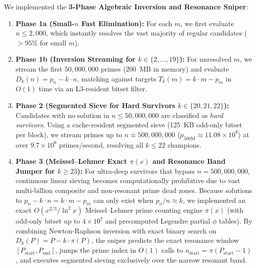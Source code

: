 \documentclass[11pt,a4paper]{article}
\theoremstyle{definition}
\theoremstyle{remark}
\begin{document}
We implemented the \textbf{3-Phase Algebraic Inversion and Resonance Sniper}:
\begin{enumerate}
    \item \textbf{Phase 1a (Small-$n$ Fast Elimination):} For each $m$, we first evaluate $n \le 2,000$, which instantly resolves the vast majority of regular candidates ($>95\%$ for small $m$).
    \item \textbf{Phase 1b (Inversion Streaming for $k \in \{2, \dots, 19\}$):} For unresolved $m$, we stream the first $50,000,000$ primes ($200$~MB in memory) and evaluate $D_k(n) = p_n - k \cdot n$, matching against targets $T_k(m) = k \cdot m - p_m$ in $O(1)$ time via an L3-resident bitset filter.
    \item \textbf{Phase 2 (Segmented Sieve for Hard Survivors $k \in \{20, 21, 22\}$):} Candidates with no solution in $n \le 50,000,000$ are classified as \textit{hard survivors}. Using a cache-resident segmented sieve (125~KB odd-only bitset per block), we stream primes up to $n \approx 500,000,000$ ($p_{500\text{M}} \approx 11.08 \times 10^9$) at over $9.7 \times 10^6$ primes/second, resolving all $k \le 22$ champions.
    \item \textbf{Phase 3 (Meissel--Lehmer Exact $\pi(x)$ and Resonance Band Jumper for $k \ge 23$):} For ultra-deep survivors that bypass $n = 500,000,000$, continuous linear sieving becomes computationally prohibitive due to vast multi-billion composite and non-resonant prime dead zones. Because solutions to $p_n - k \cdot n = k \cdot m - p_m$ can only exist when $p_n / n \approx k$, we implemented an exact $O(x^{2/3}/\ln^2 x)$ Meissel--Lehmer prime counting engine $\pi(x)$ (with odd-only bitset up to $4 \times 10^7$ and precomputed Legendre partial $\phi$ tables). By combining Newton-Raphson inversion with exact binary search on $D_k(P) = P - k \cdot \pi(P)$, the sniper predicts the exact resonance window $[P_{\text{start}}, P_{\text{end}}]$, jumps the prime index in $O(1)$ calls to $n_{\text{start}} = \pi(P_{\text{start}}-1)$, and executes segmented sieving exclusively over the narrow resonant band.
\end{enumerate}
\end{document}
